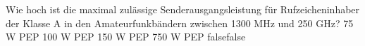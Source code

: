     {Wie hoch ist die maximal zulässige Senderausgangsleistung für Rufzeicheninhaber der Klasse A in den Amateurfunkbändern zwischen 1300 MHz und 250 GHz?}
    {75 W PEP}
    {100 W PEP}
    {150 W PEP}
    {750 W PEP}
    {false}{false}